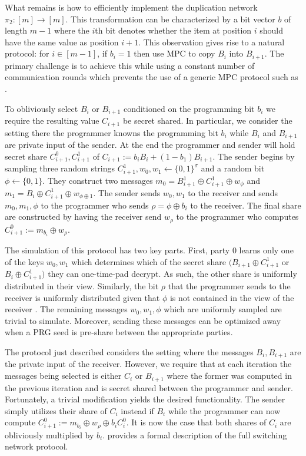 What remains is how to efficiently implement the duplication network $\pi_2:[m]\rightarrow[m]$. This transformation can be characterized by a bit vector $b$ of length $m-1$ where the $i$th bit denotes whether the item at position $i$ should have the same value as position $i+1$. This observation gives rise to a natural protocol: for $i\in [m-1]$, if $b_i=1$ then use MPC to copy $B_i$ into $B_{i+1}$. The primary challenge is to achieve this while using a constant number of communication rounds which prevents the use of a generic MPC protocol such as \cite{aby3, highthroughput}.

To obliviously select $B_i$ or $B_{i+1}$ conditioned on the programming bit $b_i$ we require the resulting value $C_{i+1}$ be secret shared. In particular, we consider the setting there the programmer knowns the programming bit $b_i$ while $B_i$ and $B_{i+1}$ are private input of the sender. At the end the programmer and sender will hold secret share $C^0_{i+1}, C_{i+1}^1$ of $C_{i+1}:=b_i B_i + (1-b_1)B_{i+1}$. The sender begins by sampling three random strings $C_{i+1}^1, w_0,w_1\gets \{0,1\}^\sigma$ and a random bit $\phi\gets \{0,1\}$. They construct two messages $m_0=B_{i+1}^1\oplus C_{i+1}^1\oplus w_\phi$ and $m_1= B_i\oplus C_{i+1}^1 \oplus w_{\phi\oplus 1}$. The sender sends $w_0,w_1$ to the receiver and sends $m_0,m_1,\phi$ to the programmer who sends $\rho=\phi\oplus b_i$ to the receiver. The final share are constructed by having the receiver send $w_\rho$ to the programmer who computes $C_{i+1}^0:=m_{b_i}\oplus w_{\rho}$.

The simulation of this protocol has two key parts. First, party 0 learns only one of the keys $w_0,w_1$ which determines which of the secret share $(B_{i+1}\oplus C_{i+1}^1$ or $  B_i\oplus C_{i+1}^1)$ they can one-time-pad decrypt. As such, the other share is uniformly distributed in their view. Similarly, the bit $\rho$ that the programmer sends to the receiver is uniformly distributed given that $\phi$ is not contained in the view of the receiver . The remaining messages $w_0,w_1,\phi$ which are uniformly sampled are trivial to simulate. Moreover, sending these messages can be optimized away when a PRG seed is pre-share between the appropriate parties.

The protocol just described considers the setting where the messages $B_i,B_{i+1}$ are the private input of the receiver. However, we require that at each iteration the messages being selected is either $C_i$ or $B_{i+1}$ where the former was computed in the previous iteration and is secret shared between the programmer and sender. Fortunately, a trivial modification yields the desired functionality. The sender simply utilizes their share of $C_i$ instead if $B_i$ while the programmer can now compute $C_{i+1}^0:=m_{b_i}\oplus w_{\rho}\oplus b_iC_{i}^0$. It is now the case that both shares of $C_i$ are obliviously multiplied by $b_i$.  provides a formal description of the full switching network protocol.


